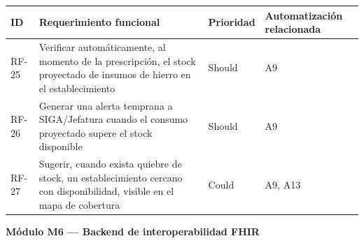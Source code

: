 \documentclass[11pt,a4paper]{article}
\begin{document}
{\small
\begin{longtable}[]{@{}
  >{\raggedright\arraybackslash}p{}
  >{\raggedright\arraybackslash}p{}
  >{\raggedright\arraybackslash}p{}
  >{\raggedright\arraybackslash}p{}@{}}
\toprule\noalign{}
\begin{minipage}[b]{\linewidth}\raggedright
ID
\end{minipage} & \begin{minipage}[b]{\linewidth}\raggedright
Requerimiento funcional
\end{minipage} & \begin{minipage}[b]{\linewidth}\raggedright
Prioridad
\end{minipage} & \begin{minipage}[b]{\linewidth}\raggedright
Automatización relacionada
\end{minipage} \\
\midrule\noalign{}
\endhead
\bottomrule\noalign{}
\endlastfoot
RF-25 & Verificar automáticamente, al momento de la prescripción, el stock proyectado de insumos de hierro en el establecimiento & Should & A9 \\
RF-26 & Generar una alerta temprana a SIGA/Jefatura cuando el consumo proyectado supere el stock disponible & Should & A9 \\
RF-27 & Sugerir, cuando exista quiebre de stock, un establecimiento cercano con disponibilidad, visible en el mapa de cobertura & Could & A9, A13 \\
\end{longtable}
}

\textbf{Módulo M6 --- Backend de interoperabilidad FHIR}
\end{document}

